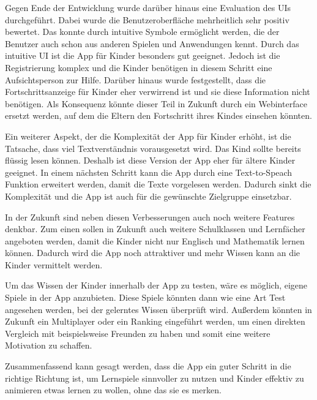 Gegen Ende der Entwicklung wurde darüber hinaus eine Evaluation des \aclp{UI} durchgeführt. Dabei wurde die Benutzeroberfläche mehrheitlich sehr positiv bewertet. Das konnte durch intuitive Symbole ermöglicht werden, die der Benutzer auch schon aus anderen Spielen und Anwendungen kennt. Durch das intuitive \ac{UI} ist die App für Kinder besonders gut geeignet. Jedoch ist die Registrierung komplex und die Kinder benötigen in diesem Schritt eine Aufsichtsperson zur Hilfe. Darüber hinaus wurde festgestellt, dass die Fortschrittsanzeige für Kinder eher verwirrend ist und sie diese Information nicht benötigen. Als Konsequenz könnte dieser Teil in Zukunft durch ein Webinterface ersetzt werden, auf dem die Eltern den Fortschritt ihres Kindes einsehen könnten. 
	
Ein weiterer Aspekt, der die Komplexität der App für Kinder erhöht, ist die Tatsache, dass viel Textverständnis vorausgesetzt wird. Das Kind sollte bereits flüssig lesen können. Deshalb ist diese Version der App eher für ältere Kinder geeignet. In einem nächsten Schritt kann die App durch eine Text-to-Speach Funktion erweitert werden, damit die Texte vorgelesen werden. Dadurch sinkt die Komplexität und die App ist auch für die gewünschte Zielgruppe einsetzbar.

In der Zukunft sind neben diesen Verbesserungen auch noch weitere Features denkbar. Zum einen sollen in Zukunft auch weitere Schulklassen und Lernfächer angeboten werden, damit die Kinder nicht nur Englisch und Mathematik lernen können. Dadurch wird die App noch attraktiver und mehr Wissen kann an die Kinder vermittelt werden. 

Um das Wissen der Kinder innerhalb der App zu testen, wäre es möglich, eigene Spiele in der App anzubieten. Diese Spiele könnten dann wie eine Art Test angesehen werden, bei der gelerntes Wissen überprüft wird. Außerdem könnten in Zukunft ein Multiplayer oder ein Ranking eingeführt werden, um einen direkten Vergleich mit beispielsweise Freunden zu haben und somit eine weitere Motivation zu schaffen.

Zusammenfassend kann gesagt werden, dass die App ein guter Schritt in die richtige Richtung ist, um Lernspiele sinnvoller zu nutzen und Kinder effektiv zu animieren etwas lernen zu wollen, ohne das sie es merken.